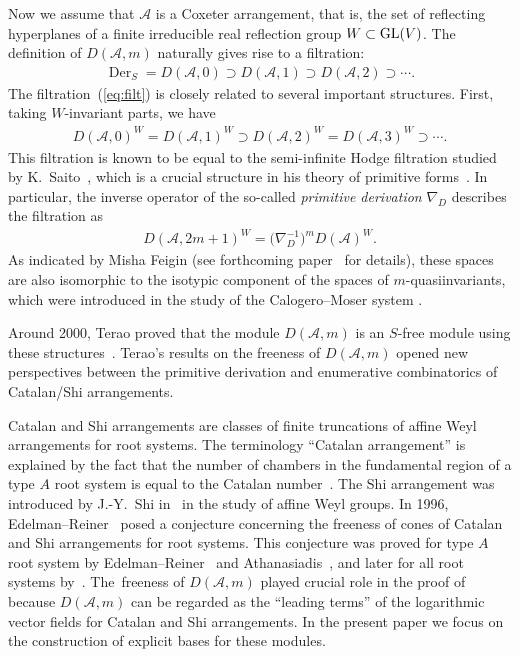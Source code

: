 \documentclass[pdftex]{sigma}
\numberwithin{equation}{section}
\newcommand{\A}{\mathcal{A}}
\newcommand{\Der}{\operatorname{Der}}
\begin{document}
Now we assume that $\A$ is a Coxeter arrangement, that is,
the set of reflecting hyperplanes of a finite irreducible real reflection group
$W\subset {\rm GL}(V)$.
The definition of $D(\A, m)$ naturally gives rise to a filtration:
\begin{gather}
\label{eq:filt}
\Der_S=D(\A, 0)\supset D(\A, 1)\supset D(\A, 2)\supset\cdots.
\end{gather}
The filtration~(\ref{eq:filt}) is closely related to several important structures.
First, taking $W$-invariant parts, we have
\begin{gather*}
D(\A, 0)^W= D(\A, 1)^W\supset D(\A, 2)^W= D(\A, 3)^W\supset\cdots.
\end{gather*}
This filtration is known to be equal to the semi-infinite Hodge filtration studied by
K.~Saito~\cite{sai-lin, sai-unif, ter-hodge, yos-prim},
which is a crucial structure in his theory
of primitive forms~\cite{sai-prim}.
In particular, the inverse operator of the
so-called \emph{primitive derivation} $\nabla_D$ describes the filtration as
\begin{gather*}
D(\A, 2m+1)^W=\big(\nabla_D^{-1}\big)^mD(\A)^W.
\end{gather*}
As indicated by Misha Feigin (see forthcoming paper~\cite{aefy} for details),
these spaces are also isomorphic
to the isotypic component of the spaces of $m$-quasiinvariants, which
were introduced in the study of the Calogero--Moser system
\cite{bm, cha-ves, fei-ves}.

Around 2000, Terao proved that the module $D(\A, m)$ is an
$S$-free module using these structures~\cite{ter-mult}.
Terao's results on the freeness of $D(\A, m)$ opened new perspectives
between the primitive derivation and enumerative combinatorics of
Catalan/Shi arrangements.

Catalan and Shi arrangements are classes of finite truncations of
affine Weyl arrangements for root systems.
The terminology ``Catalan arrangement''
is explained by the fact that the number of chambers in the fundamental
region of a type $A$ root system is equal to the Catalan number~\cite{ps-def}.
The Shi arrangement was introduced by J.-Y.~Shi in~\cite{shi-kl}
in the study of affine Weyl groups.
In 1996, Edelman--Reiner~\cite{ede-rei} posed a conjecture concerning the
freeness of cones of Catalan and Shi arrangements for root systems.
This conjecture was proved for type $A$ root system
by Edelman--Reiner~\cite{ede-rei} and
Athanasiadis~\cite{ath-free}, and later for all root systems by~\cite{yos-char}.
The~freeness of $D(\A, m)$ played crucial role in the proof of
\cite{yos-char} because $D(\A, m)$ can be regarded as the ``leading terms''
of the logarithmic vector fields for Catalan and Shi arrangements.
In the present paper we focus on the construction of explicit bases for
these modules.
\end{document}
